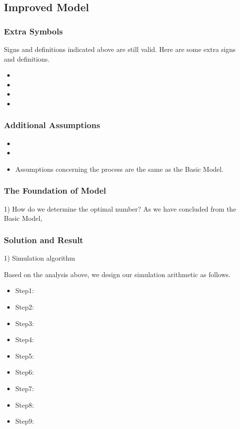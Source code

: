 \documentclass{tzmcmthesis}
\begin{document}
\subsection{Improved Model}


\subsubsection{Extra Symbols}
Signs and definitions indicated above are still valid. Here are some extra signs and definitions.
\begin{itemize}
\item 	
\item
\item
\item
\end{itemize}


\subsubsection{Additional Assumptions}
\begin{itemize}
\item 	
\item 	
\item Assumptions concerning the   process are the same as the Basic Model.
\end{itemize}
\subsubsection{The Foundation of Model}
1) How do we determine the optimal number?
As we have concluded from the Basic Model,
\subsubsection{Solution and Result}
1) Simulation algorithm


Based on the analysis above, we design our simulation arithmetic as follows.

\begin{itemize}
\item Step1:
\item Step2:
\item Step3:

\item Step4:
\item Step5:
\item Step6:
\item Step7:
\item Step8:
\item Step9:
\end{itemize}
\end{document}
